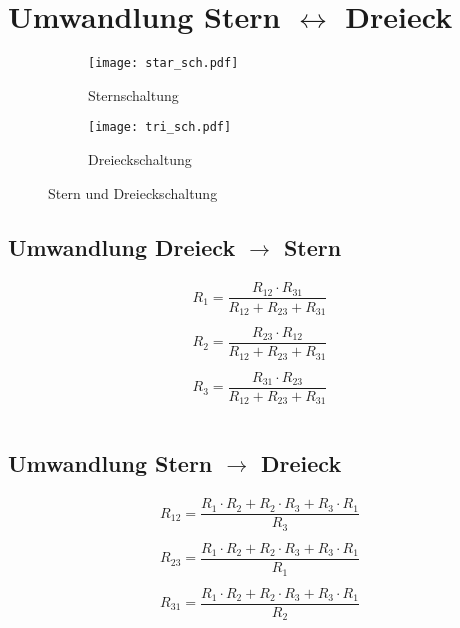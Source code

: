 



\section{Umwandlung Stern $\leftrightarrow$ Dreieck}
\begin{figure}[h!]
	\centering
	\begin{subfigure}[b]{0.4\textwidth}
		\centering
		\texttt{[image: star\_sch.pdf]}
		\caption{Sternschaltung}
		\label{sch:star}
	\end{subfigure}
	\begin{subfigure}[b]{0.4\textwidth}
		\centering
		\texttt{[image: tri\_sch.pdf]}
		\caption{Dreieckschaltung}
		\label{sch:tri}
	\end{subfigure}
	\caption{Stern und Dreieckschaltung}
	\label{sch:tristar}
\end{figure}


\subsection{Umwandlung Dreieck $\to$ Stern}
\[ \begin{matrix}
R_1 = \dfrac{R_{12} \cdot R_{31}}{R_{12} + R_{23} + R_{31}}\\\\
R_2 = \dfrac{R_{23} \cdot R_{12}}{R_{12} + R_{23} + R_{31}}\\\\
R_3 = \dfrac{R_{31} \cdot R_{23}}{R_{12} + R_{23} + R_{31}}\\\\
\end{matrix} \]

\subsection{Umwandlung Stern $\to$ Dreieck}
\[ \begin{matrix}
R_{12} = \dfrac{R_1 \cdot R_2 + R_2 \cdot R_3 + R_3 \cdot R_1}{R_3}\\\\
R_{23} = \dfrac{R_1 \cdot R_2 + R_2 \cdot R_3 + R_3 \cdot R_1}{R_1}\\\\
R_{31} = \dfrac{R_1 \cdot R_2 + R_2 \cdot R_3 + R_3 \cdot R_1}{R_2}\\\\
\end{matrix} \]

